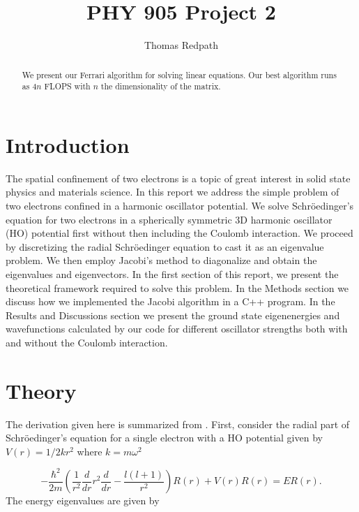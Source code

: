 \documentclass[10pt,showpacs,preprintnumbers,footinbib,amsmath,amssymb,aps,prl,twocolumn,groupedaddress,superscriptaddress,showkeys]{revtex4-1}
\begin{document}
\title{PHY 905 Project 2}
\author{Thomas Redpath}
\begin{abstract}
We present our Ferrari algorithm for solving linear equations. Our best algorithm runs as $4n$ FLOPS with $n$ the dimensionality of the matrix.
\end{abstract}
\maketitle

\section{Introduction}

The spatial confinement of two electrons is a topic of great interest in
solid state physics and materials science. In this report we address
the simple problem of two electrons confined in a harmonic oscillator
potential. We solve Schr\"{o}edinger's equation for two electrons
in a spherically symmetric 3D harmonic oscillator (HO) potential first
without then including the Coulomb interaction. We proceed by
discretizing the radial Schr\"{o}edinger equation to cast it as an
eigenvalue problem. We then employ Jacobi's method to diagonalize
and obtain the eigenvalues and eigenvectors. In the first section of
this report, we present the theoretical framework required to solve
this problem. In the Methods section we discuss how we implemented
the Jacobi algorithm in a C++ program. In the Results and Discussions
section we present the ground state eigenenergies and wavefunctions
calculated by our code for different oscillator strengths both with and
without the Coulomb interaction.


\section{Theory}

The derivation given here is summarized from \citet{Morten}.
First, consider the radial part of Schr\"{o}edinger's equation for a
single electron with a HO potential given by $V(r) = 1/2 kr^2$
where $k = m \omega^2$

\begin{equation*}
  -\frac{\hbar^2}{2 m} \left ( \frac{1}{r^2} \frac{d}{dr} r^2
  \frac{d}{dr} - \frac{l (l + 1)}{r^2} \right )R(r) 
     + V(r) R(r) = E R(r).
\end{equation*}
The energy eigenvalues are given by
\end{document}
